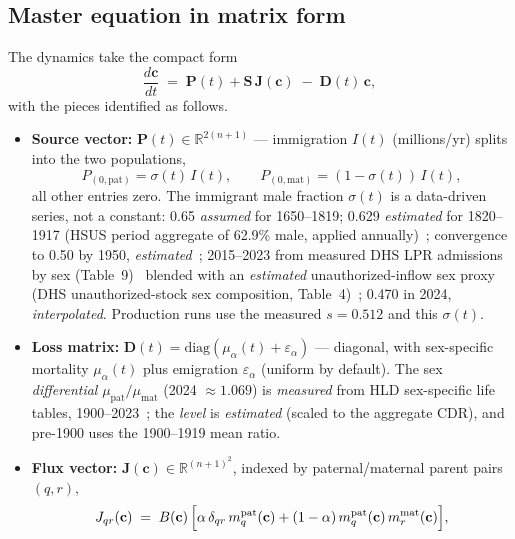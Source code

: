 \documentclass[11pt,a4paper]{article}
\begin{document}
\subsection{Master equation in matrix form}
The dynamics take the compact form
\begin{equation}
  \frac{d\mathbf{c}}{dt} \;=\; \mathbf{P}(t) + \mathbf{S}\,\mathbf{J}(\mathbf{c})
  \;-\; \mathbf{D}(t)\,\mathbf{c},
  \label{eq:master}
\end{equation}
with the pieces identified as follows.
\begin{itemize}
  \item \textbf{Source vector:} $\mathbf{P}(t)\in\mathbb{R}^{2(n+1)}$ ---
    immigration $I(t)$ (millions/yr) splits into the two populations,
    \[
      P_{(0,\mathrm{pat})}=\sigma(t)\,I(t),\qquad
      P_{(0,\mathrm{mat})}=(1-\sigma(t))\,I(t),
    \]
    all other entries zero.  The immigrant male fraction $\sigma(t)$ is a
    data-driven series, not a constant: 0.65 \emph{assumed} for 1650--1819;
    0.629 \emph{estimated} for 1820--1917 (HSUS period aggregate of 62.9\%
    male, applied annually)~\cite{hsus-immig}; convergence to 0.50 by 1950,
    \emph{estimated}~\cite{hsus-immig}; 2015--2023 from measured DHS LPR
    admissions by sex (Table~9)~\cite{dhs-lpr-sex} blended with an
    \emph{estimated} unauthorized-inflow sex proxy (DHS unauthorized-stock
    sex composition, Table~4)~\cite{dhs-unauth-table4}; 0.470 in 2024,
    \emph{interpolated}.  Production runs use the measured $s=0.512$ and
    this $\sigma(t)$.
  \item \textbf{Loss matrix:} $\mathbf{D}(t)=\mathrm{diag}(\mu_\alpha(t)+
    \varepsilon_\alpha)$ --- diagonal, with sex-specific mortality
    $\mu_\alpha(t)$ plus emigration $\varepsilon_\alpha$ (uniform by
    default).  The sex \emph{differential} $\mu_{\mathrm{pat}}/\mu_
    {\mathrm{mat}}$ (2024 $\approx 1.069$) is \emph{measured} from HLD
    sex-specific life tables, 1900--2023~\cite{hld}; the \emph{level} is
    \emph{estimated} (scaled to the aggregate CDR), and pre-1900 uses the
    1900--1919 mean ratio.
  \item \textbf{Flux vector:} $\mathbf{J}(\mathbf{c})\in\mathbb{R}^{(n+1)^2}$,
    indexed by paternal/maternal parent pairs $(q,r)$,
    \begin{equation}
      J_{qr}(\mathbf{c}) \;=\; B(\mathbf{c})\,
      \Bigl[\alpha\,\delta_{qr}\,m_q^{\mathrm{pat}}(\mathbf{c})
      + (1-\alpha)\,m_q^{\mathrm{pat}}(\mathbf{c})\,
                     m_r^{\mathrm{mat}}(\mathbf{c})\Bigr],
      \label{eq:mating}

\end{equation}
\end{itemize}
\end{document}
